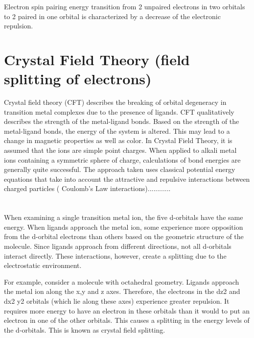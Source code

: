 \documentclass[openany,11pt,a4paper]{report}
\begin{document}
Electron spin pairing energy transition from 2 unpaired electrons in two orbitals to 2 paired in one orbital is characterized by a decrease of the electronic repulsion. \cite{spinpairing}



\section{Crystal Field Theory (field splitting of electrons)}

Crystal field theory (CFT) describes the breaking of orbital degeneracy in transition metal complexes due to the presence of ligands. CFT qualitatively describes the strength of the metal-ligand bonds. Based on the strength of the metal-ligand bonds, the energy of the system is altered. This may lead to a change in magnetic properties as well as color. 
In Crystal Field Theory, it is assumed that the ions are simple point charges. When applied to alkali metal ions containing a symmetric sphere of charge, calculations of bond energies are generally quite successful. The approach taken uses classical potential energy equations that take into account the attractive and repulsive interactions between charged particles ( Coulomb's Law interactions)............\\\\\\



When examining a single transition metal ion, the five d-orbitals have the same energy. When ligands approach the metal ion, some experience more opposition from the d-orbital electrons than others based on the geometric structure of the molecule. Since ligands approach from different directions, not all d-orbitals interact directly. These interactions, however, create a splitting due to the electrostatic environment.



For example, consider a molecule with octahedral geometry. Ligands approach the metal ion along the x,y and z axes. Therefore, the electrons in the  dz2  and  dx2 y2 orbitals (which lie along these axes) experience greater repulsion. It requires more energy to have an electron in these orbitals than it would to put an electron in one of the other orbitals. This causes a splitting in the energy levels of the d-orbitals. This is known as crystal field splitting.


 \cite{CFT}
\end{document}
